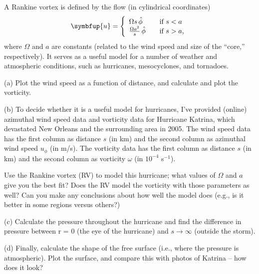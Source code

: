 \begin{problem}
A Rankine vortex is defined by the flow (in cylindrical coordinates)
\[
\symbfup{u}  = \left\{
 \begin{array}{l l}
    \Omega s \, \hat{\phi} & \quad \text{if $s < a$}\\
   \frac{\Omega a^2}{s} \, \hat{\phi} & \quad \text{if $s>a$,}
  \end{array} \right.
\]
where $\Omega$ and $a$ are constants (related to the wind speed and size of the ``core,'' respectively).  It serves as a useful model for a number of weather and atmospheric conditions, such as hurricanes, mesocyclones, and tornadoes.  

(a) Plot the wind speed as a function of distance, and calculate and plot the vorticity.

(b) To decide whether it is a useful model for hurricanes, I've provided (online) azimuthal wind speed data and vorticity data for Hurricane Katrina, which devastated New Orleans and the surrounding area in 2005.  The wind speed data has the first column as distance $s$ (in km) and the second column as azimuthal wind speed $u_\phi$ (in m/s).  The vorticity data has the first column as distance $s$ (in km) and the second column as vorticity $\omega$ (in $10^{-4}$ s$^{-1}$).

Use the Rankine vortex (RV) to model this hurricane; what values of $\Omega$ and $a$ give you the best fit?  Does the RV model the vorticity with those parameters as well?  Can you make any conclusions about how well the model does (e.g., is it better in some regions versus others?)

(c) Calculate the pressure throughout the hurricane and find the difference in pressure between r = 0 (the eye of the hurricane) and $s \to \infty$ (outside the storm).

(d) Finally, calculate the shape of the free surface (i.e., where the pressure is atmospheric). Plot the surface, and compare this with photos of Katrina -- how does it look?
\end{problem}



